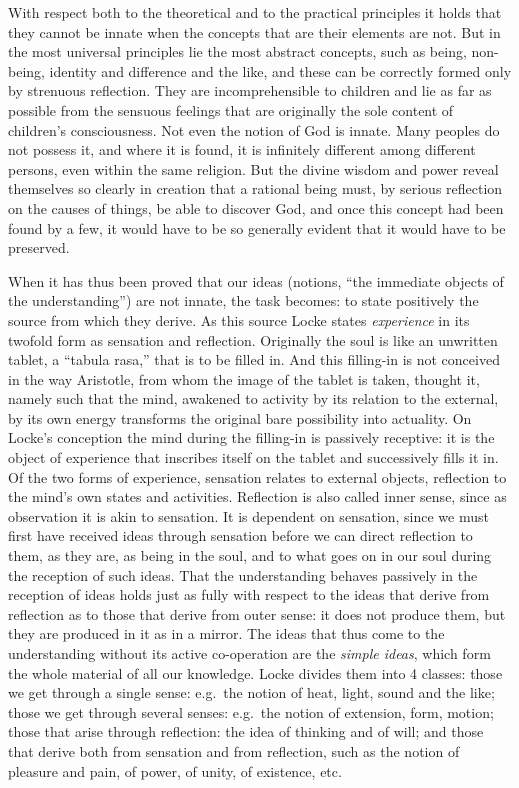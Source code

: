With respect both to the theoretical and to the practical principles
it holds that they cannot be innate when the concepts that are their
elements are not. But in the most universal principles lie the most
abstract concepts, such as being, non-being, identity and difference
and the like, and these can be correctly formed only by strenuous
reflection. They are incomprehensible to children and lie as far as
possible from the sensuous feelings that are originally the sole content
of children's consciousness. Not even the notion of God is innate. Many
peoples do not possess it, and where it is found, it is infinitely
different among different persons, even within the same religion. But
the divine wisdom and power reveal themselves so clearly in creation
that a rational being must, by serious reflection on the
causes of things, be able to discover God, and once this concept had
been found by a few, it would have to be so generally evident that it
would have to be preserved.

When it has thus been proved that our ideas (notions, ``the immediate
objects of the understanding'') are not innate, the task becomes: to
state positively the source from which they derive. As this source
Locke states \emph{experience} in its twofold form as sensation and
reflection. Originally the soul is like an unwritten tablet, a ``tabula
rasa,'' that is to be filled in. And this filling-in is not conceived
in the way Aristotle, from whom the image of the tablet is taken,
thought it, namely such that the mind, awakened to activity by its
relation to the external, by its own energy transforms the original
bare possibility into actuality. On Locke's conception the mind during
the filling-in is passively receptive: it is the object of experience
that inscribes itself on the tablet and successively fills it in. Of
the two forms of experience, sensation relates to external objects,
reflection to the mind's own states and activities. Reflection is also
called inner sense, since as observation it is akin to sensation. It is
dependent on sensation, since we must first have received ideas through
sensation before we can direct reflection to them, as they are, as
being in the soul, and to what goes on in our soul during the reception
of such ideas. That the understanding behaves passively in the
reception of ideas holds just as fully with respect to the ideas that
derive from reflection as to those that derive from outer sense: it
does not produce them, but they are produced in it as in a mirror. The
ideas that thus come to the understanding without its active
co-operation are the \emph{simple ideas}, which form the whole material
of all our knowledge. Locke divides them into 4 classes: those we get
through a single sense: e.g.\ the notion of heat, light, sound and the
like; those we get through several senses: e.g.\ the notion of
extension, form, motion; those that arise through reflection: the idea
of thinking and of will; and those that derive both from
sensation and from reflection, such as the notion of pleasure and pain,
of power, of unity, of existence, etc.

